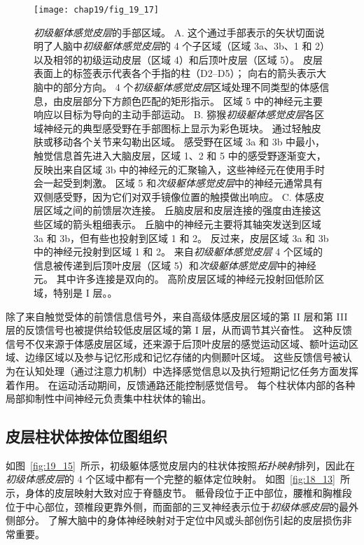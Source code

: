 \begin{figure}[htbp]
	\centering
	\texttt{[image: chap19/fig\_19\_17]}
	\caption{\textit{初级躯体感觉皮层}的手部区域。 
		A. 这个通过手部表示的矢状切面说明了人脑中\textit{初级躯体感觉皮层}的 4 个子区域（区域 3a、3b、1 和 2）以及相邻的初级运动皮层（区域 4）和后顶叶皮层（区域 5）。
		皮层表面上的标签表示代表各个手指的柱（D2–D5）；
		向右的箭头表示大脑中的部分方向。
		4 个\textit{初级躯体感觉皮层}区域处理不同类型的体感信息，由皮层部分下方颜色匹配的矩形指示。
		区域 5 中的神经元主要响应以目标为导向的主动手部运动。
		B. 猕猴\textit{初级躯体感觉皮层}各区域神经元的典型感受野在手部图标上显示为彩色斑块。
		通过轻触皮肤或移动各个关节来勾勒出区域。
		感受野在区域 3a 和 3b 中最小，触觉信息首先进入大脑皮层，区域 1、2 和 5 中的感受野逐渐变大，反映出来自区域 3b 中的神经元的汇聚输入，这些神经元在使用手时会一起受到刺激。
		区域 5 和\textit{次级躯体感觉皮层}中的神经元通常具有双侧感受野，因为它们对双手镜像位置的触摸做出响应\cite{gardner1988somatosensory,iwamura1993rostrocaudal,iwamura1994bilateral}。
		C. 体感皮层区域之间的前馈层次连接。
		丘脑皮层和皮层连接的强度由连接这些区域的箭头粗细表示。
		丘脑中的神经元主要将其轴突发送到区域 3a 和 3b，但有些也投射到区域 1 和 2。
		反过来，皮层区域 3a 和 3b 中的神经元投射到区域 1 和 2。
		来自\textit{初级躯体感觉皮层} 4 个区域的信息被传递到后顶叶皮层（区域 5）和\textit{次级躯体感觉皮层}中的神经元。
		其中许多连接是双向的。
		高阶皮层区域的神经元投射回低阶区域，特别是 I 层。\cite{felleman1991distributed}。}
	\label{fig:19_17}
\end{figure}


除了来自触觉受体的前馈信息信号外，来自高级体感皮层区域的第 II 层和第 III 层的反馈信号也被提供给较低皮层区域的第 I 层，从而调节其兴奋性。
这种反馈信号不仅来源于体感皮层区域，还来源于后顶叶皮层的感觉运动区域、额叶运动区域、边缘区域以及参与记忆形成和记忆存储的内侧颞叶区域。
这些反馈信号被认为在认知处理（通过注意力机制）中选择感觉信息以及执行短期记忆任务方面发挥着作用。
在运动活动期间，反馈通路还能控制感觉信号。
每个柱状体内部的各种局部抑制性中间神经元负责集中柱状体的输出。



\subsection{皮层柱状体按体位图组织}

如图~\ref{fig:19_15}~所示，初级躯体感觉皮层内的柱状体按照\textit{拓扑映射}排列，因此在\textit{初级体感皮层}的 4 个区域中都有一个完整的躯体定位映射。
如图~\ref{fig:18_13}~所示，身体的皮层映射大致对应于脊髓皮节。
骶骨段位于正中部位，腰椎和胸椎段位于中心部位，颈椎段更靠外侧，而面部的三叉神经表示位于\textit{初级体感皮层}的最外侧部分。
了解大脑中的身体神经映射对于定位中风或头部创伤引起的皮层损伤非常重要。


